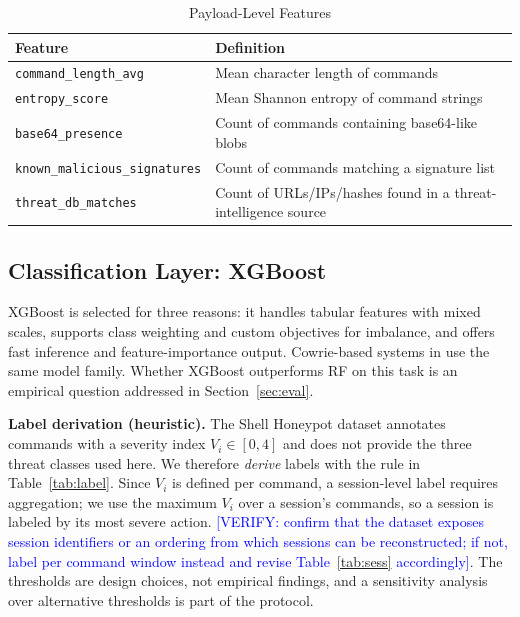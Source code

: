 \documentclass[conference]{IEEEtran}
\newcommand{\ver}[1]{\textcolor{blue}{[VERIFY: #1]}}
\begin{document}
\begin{table}[t]
\centering
\caption{Payload-Level Features}
\label{tab:pay}
\footnotesize
\begin{tabular}{@{}p{2.9cm}p{5.3cm}@{}}
\toprule
Feature & Definition \\
\midrule
\texttt{command\_\allowbreak{}length\_\allowbreak{}avg} & Mean character length of commands \\
\texttt{entropy\_\allowbreak{}score} & Mean Shannon entropy of command strings \\
\texttt{base64\_\allowbreak{}presence} & Count of commands containing base64-like blobs \\
\texttt{known\_\allowbreak{}malicious\_\allowbreak{}signatures} & Count of commands matching a signature list \\
\texttt{threat\_\allowbreak{}db\_\allowbreak{}matches} & Count of URLs/IPs/hashes found in a threat-intelligence source \\
\bottomrule
\end{tabular}
\end{table}

\subsection{Classification Layer: XGBoost}\label{sec:clf}
XGBoost \cite{ref13} is selected for three reasons: it handles tabular features with mixed scales, supports class weighting and custom objectives for imbalance, and offers fast inference and feature-importance output. Cowrie-based systems in \cite{ref1,ref2} use the same model family. Whether XGBoost outperforms RF \cite{ref4,ref5} on this task is an empirical question addressed in Section~\ref{sec:eval}.

\textbf{Label derivation (heuristic).} The Shell Honeypot dataset \cite{ref10} annotates commands with a severity index $V_i\in[0,4]$ and does not provide the three threat classes used here. We therefore \emph{derive} labels with the rule in Table~\ref{tab:label}. Since $V_i$ is defined per command, a session-level label requires aggregation; we use the maximum $V_i$ over a session's commands, so a session is labeled by its most severe action. \ver{confirm that the dataset exposes session identifiers or an ordering from which sessions can be reconstructed; if not, label per command window instead and revise Table~\ref{tab:sess} accordingly}. The thresholds are design choices, not empirical findings, and a sensitivity analysis over alternative thresholds is part of the protocol.
\end{document}
